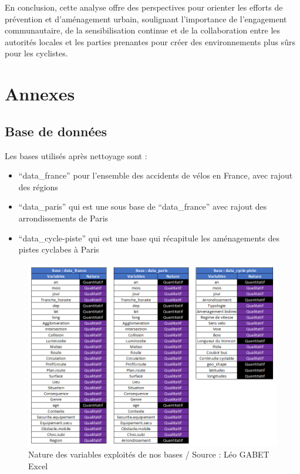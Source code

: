 \documentclass[french,]{compterendu}
\providecommand{\tightlist}{%
  \setlength{\itemsep}{0pt}\setlength{\parskip}{0pt}}
\theoremstyle{urcastyle}
\theoremstyle{remark}
\begin{document}
En conclusion, cette analyse offre des perspectives pour orienter les efforts de prévention et d'aménagement urbain, soulignant l'importance de l'engagement communautaire, de la sensibilisation continue et de la collaboration entre les autorités locales et les parties prenantes pour créer des environnements plus sûrs pour les cyclistes.

\newpage

\hypertarget{annexes}{%
\section{Annexes}\label{annexes}}

\hypertarget{base-de-donnuxe9es}{%
\subsection{Base de données}\label{base-de-donnuxe9es}}

Les bases utilisés après nettoyage sont :

\begin{itemize}
\tightlist
\item
  ``data\_france'' pour l'ensemble des accidents de vélos en France, avec rajout des régions
\item
  ``data\_paris'' qui est une sous base de ``data\_france'' avec rajout des arrondissements de Paris
\item
  ``data\_cycle-piste'' qui est une base qui récapitule les aménagements des pistes cyclabes à Paris
\end{itemize}

\begin{figure}
\centering
\includegraphics{images/VAR.png}
\caption{Nature des variables exploités de nos bases / Source : Léo GABET Excel}
\end{figure}
\end{document}
